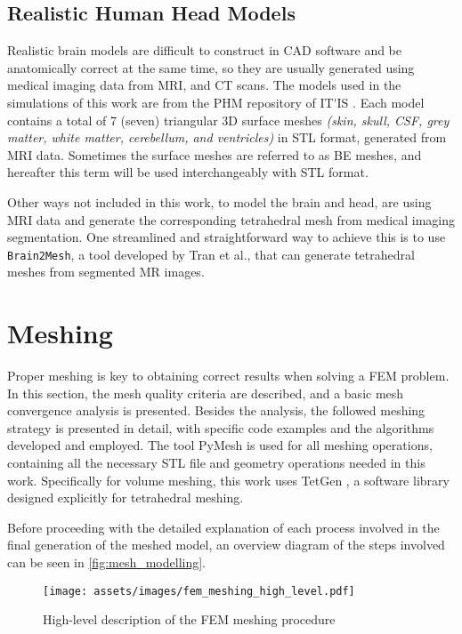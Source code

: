 \subsection{Realistic Human Head Models}
\label{sec:phm_models}

Realistic brain models are difficult to construct in \gls{CAD} software and be anatomically correct at the same time, so they are usually generated using medical imaging data from \gls{MRI}, and \gls{CT} scans. The models used in the simulations of this work are from the \gls{PHM} repository of \gls{IT'IS} \cite{ErikG.Lee2016,Lee2018,Lee2016}. Each model contains a total of 7 (seven) triangular 3D surface meshes \textit{(skin, skull, \gls{CSF}, grey matter, white matter, cerebellum, and ventricles)} in \gls{STL} format, generated from \gls{MRI} data. Sometimes the surface meshes are referred to as \gls{BE} meshes, and hereafter this term will be used interchangeably with \gls{STL} format.

Other ways not included in this work, to model the brain and head, are using \gls{MRI} data and generate the corresponding tetrahedral mesh from medical imaging segmentation. One streamlined and straightforward way to achieve this is to use \texttt{Brain2Mesh}, a tool developed by Tran et al.\cite{Tran2020}, that can generate tetrahedral meshes from segmented \gls{MR} images.

\section{Meshing}
\label{sec:fem_meshing}

Proper meshing is key to obtaining correct results when solving a \gls{FEM} problem. In this section, the mesh quality criteria are described, and a basic mesh convergence analysis is presented. Besides the analysis, the followed meshing strategy is presented in detail, with specific code examples and the algorithms developed and employed. The tool PyMesh \cite{pymesh} is used for all meshing operations, containing all the necessary \gls{STL} file and geometry operations needed in this work. Specifically for volume meshing, this work uses TetGen \cite{tetgen}, a software library designed explicitly for tetrahedral meshing.

Before proceeding with the detailed explanation of each process involved in the final generation of the meshed model, an overview diagram of the steps involved can be seen in \autoref{fig:mesh_modelling}.

\begin{figure}[H]
    \centering
    \texttt{[image: assets/images/fem\_meshing\_high\_level.pdf]}
    \caption{High-level description of the \gls{FEM} meshing procedure}
    \label{fig:mesh_modelling}
\end{figure}

